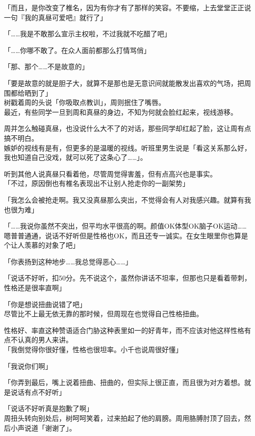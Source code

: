 「而且，是你改变了椎名，因为有你才有了那样的笑容。不要缩，上去堂堂正正说一句『我的真昼可爱吧』就行了」

「……我是不敢那么宣示主权啦，不过我就不吃醋了吧」

「……你哪不敢了。在众人面前都那么打情骂俏」

「那、那个……不是故意的」

「要是故意的就是胆子大，就算不是那也是无意识间就能散发出喜欢的气场，把周围都给晒到了」\\

树戳着周的头说「你吸取点教训」，周则抿住了嘴唇。\\

最近，有些同学一旦到周和真昼的身边，不知为何就会脸红起来，视线游移。

周并怎么触碰真昼，也没说什么大不了的对话，那些同学却红起了脸，这让周有点搞不明白。\\

嫉妒的视线有是有，但更多的是温暖的视线。听班里男生说是「看这关系那么好，我也知道自己没戏，就可以死了这条心了……」。

听到其他人说真昼只看着他，尽管周觉得害羞，但有点高兴也是事实。\\

「不过，原因倒也有椎名表现出不让别人抢走你的一副架势」

「我怎么会被抢走啊。我又没真昼那么突出，不觉得会有人对我感兴趣。就算有我也很为难」

「……我说你虽然不突出，但平均水平很高的啊。颜值OK体型OK脑子OK运动……嗯普普通通，说话不好听但是性格也OK，而且还专一诚实。在女生眼里你也算是个让人羡慕的对象了吧」

「你表扬到这种地步……我总觉得恶心……」

「说话不好听，扣50分。先不说这个，虽然你讲话不坦率，但那也只是看着带刺，性格还是很率直啊」

「你是想说扭曲说错了吧」\\

尽管比不上最无依无靠的那时候，但周现在也觉得自己性格扭曲。

性格好、率直这种赞语适合门胁这种表里如一的好青年，而不应该对他这样性格有点不认真的男人来讲。\\

「我倒觉得你很好懂，性格也很坦率。小千也说周很好懂」

「我说你们啊」

「你弄到最后，嘴上说着扭曲、扭曲的，但实际上很正直，而且很为对方着想。就是说话有点不好听」

「说话不好听真是抱歉了啊」\\

周扭头转向别处后，树呵呵笑着，过来拍起了他的肩膀。周用胳膊肘顶了回去，然后小声说道「谢谢了」。
